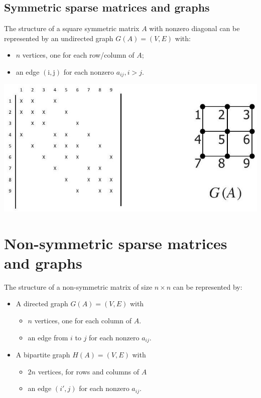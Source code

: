 \documentclass[11pt]{book}
\begin{document}
\subsection*{Symmetric sparse matrices and graphs}
The structure of a square symmetric matrix $A$ with nonzero diagonal can be represented by an undirected graph $G(A)=(V, E)$ with:
\begin{itemize}
  \item $n$ vertices, one for each row/column of $A$;

  \item an edge $(\mathrm{i}, \mathrm{j})$ for each nonzero $a_{i j}, i>j$.

\end{itemize} 
\includegraphics[scale = 0.4, center]{2023_09_05_b72ccc85584d9dc6fb5cg-225}

\section*{Non-symmetric sparse matrices and graphs}
The structure of a non-symmetric matrix of size $n \times n$ can be represented by:
\begin{itemize}
    \item A directed graph $G(A) = (V, E)$ with
    \begin{itemize}
        \item $n$ vertices, one for each column of $A$.
        \item an edge from $i$ to $j$ for each nonzero $a_{ij}$.
    \end{itemize}
    \item A bipartite graph $H(A) = (V, E)$ with
    \begin{itemize}
        \item $2n$ vertices, for rows and columns of $A$
        \item an edge $(i', j)$ for each nonzero $a_{ij}$.
    \end{itemize}
\end{itemize}
\end{document}
